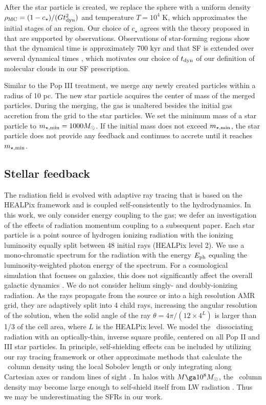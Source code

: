 \documentclass[12pt,preprint]{aastex}
\begin{document}
After the star particle is created, we replace the sphere with a
uniform density $\rho_{\rm MC} = (1 - c_\star) / (Gt_{\rm dyn}^2)$ and
temperature $T = 10^4$ K, which approximates the initial stages of an
 region.  Our choice of $c_\star$ agrees with the theory
proposed in \citet{Krumholz05} that are supported by observations.
Observations of star-forming regions show that the dynamical time is
approximately 700 kyr and that SF is extended over several dynamical
times \citep[e.g.][]{Tan06}, which motivates our choice of $t_{\rm
  dyn}$ of our definition of molecular clouds in our SF prescription.

Similar to the Pop III treatment, we merge any newly created particles
within a radius of 10 pc.  The new star particle acquires the center
of mass of the merged particles.  During the merging, the gas is
unaltered besides the initial gas accretion from the grid to the star
particles.  We set the minimum mass of a star particle to $m_{\rm
  \star, min} = 1000 \Ms$.  If the initial mass does not exceed
$m_{\rm \star, min}$, the star particle does not provide any feedback
and continues to accrete until it reaches $m_{\rm \star, min}$.

\subsection{Stellar feedback}

The radiation field is evolved with adaptive ray tracing
\citep{Abel02_RT, Wise11_Moray} that is based on the HEALPix framework
\citep{HEALPix} and is coupled self-consistently to the hydrodynamics.
In this work, we only consider energy coupling to the gas; we defer an
investigation of the effects of radiation momentum coupling to a
subsequent paper.  Each star particle is a point source of hydrogen
ionizing radiation with the ionizing luminosity equally split between
48 initial rays (HEALPix level 2).  We use a mono-chromatic spectrum
for the radiation with the energy $E_{\rm ph}$ equaling the
luminosity-weighted photon energy of the spectrum.  For a cosmological
simulation that focuses on galaxies, this does not significantly
affect the overall galactic dynamics \citep[see Sec. 6.3
  in][]{Wise11_Moray}.  We do not consider helium singly- and
doubly-ionizing radiation.  As the rays propagate from the source or
into a high resolution AMR grid, they are adaptively split into 4
child rays, increasing the angular resolution of the solution, when
the solid angle of the ray $\theta = 4\pi/(12 \times 4^{L})$ is larger
than 1/3 of the cell area, where $L$ is the HEALPix level.  We model
the \hh~dissociating radiation with an optically-thin, inverse square
profile, centered on all Pop II and III star particles.  In principle,
self-shielding effects can be included by utilizing our ray tracing
framework or other approximate methods that calculate the \hh~column
density using the local Sobolev length \citep{Wolcott11} or only
integrating along Cartesian axes or random lines of sight
\citep{Yoshida03, Yoshida07_HII, Glover07}.  In halos with $M \ga 10^8
\Ms$, the \hh~column density may become large enough to self-shield
itself from LW radiation \citep{Wise08_Gal}.  Thus we may be
underestimating the SFRs in our work.
\end{document}
